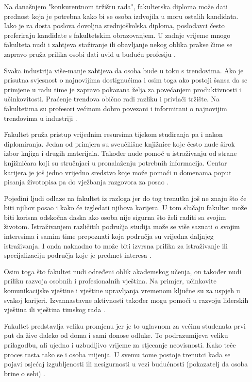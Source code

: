 \documentclass[]{foi}
\begin{document}
Na današnjem "konkurentnom tržištu rada", fakultetska diploma može dati prednost koja je potrebna kako bi se osoba izdvojila u moru ostalih kandidata. Iako je za dosta poslova dovoljna
srednjoškolska diploma, poslodavci često preferiraju kandidate s fakultetskim obrazovanjem. U zadnje vrijeme mnogo fakulteta nudi i zahtjeva stažiranje ili obavljanje nekog oblika prakse čime
se zapravo pruža prilika osobi dati uvid u buduću profesiju \cite{bisio2025college}. 

Svaka industrija više-manje zahtjeva da osoba bude u toku s trendovima. Ako je prisutna svjesnost o najnovijima dostignućima i osim toga ako postoji šansa da se primjene u radu time je zapravo 
pokazana želja za povećanjem produktivnosti i učinkovitosti. Praćenje trendova obično radi razliku i privlači tržište. Na fakultetima su profesori većinom dobro povezani i informirani
o najnovijim trendovima u industriji \cite{bisio2025college}.

Fakultet pruža pristup vrijednim resursima tijekom studiranja pa i nakon diplomiranja. Jedan od primjera su sveučilišne knjižnice koje često nude širok izbor knjiga i drugih materijala.
Također nude pomoć u istraživanju od strane knjižničara koji su stručnjaci u pronalaženju potrebnih informacija. Centar karijera je još jedno vrijedno sredstvo koje može pomoći u domenama
poput pisanja životopisa pa do vježbanja razgovora za posao \cite{bisio2025college}. 

Pojedini ljudi odlaze na fakultet iz razloga jer do tog trenutka još ne znaju što će biti njihov posao i kako će izgledati njihova karijera. U tom slučaju fakultet može biti korisna odskočna
daska ako osoba nije sigurna što želi raditi sa svojim životom. Istraživanjem različitih područja studija može se više saznati o svojim interesima i samim time prepoznati koja područja su vrijedna
daljnjeg istraživanja. I onda naknadno to može biti izvrsna prilika za istraživanje ili specijalizaciju područja koje je predmet interesa \cite{bisio2025college}.

Osim toga što fakultet nudi određeni oblik akademskog učenja, on također nudi priliku razvoja osobnih i profesionalnih vještina. Na primjer, učinkovite komunikacijske vještine i vještine upravljanja 
vremenom ključne su za uspjeh u svakoj karijeri. Izvannastavne aktivnosti također mogu pomoći u razvoju liderskih vještina ili vještina timskog rada \cite{bisio2025college}.

Fakultet predstavlja veliku promjenu jer je to uglavnom za većinu studenata prvi put da žive daleko od doma i sami donose odluke. To podrazumijeva veliku prilagodbu, ali ujedno i uzbudljivo vrijeme
za stjecanje neovisnosti. Kako teče proces rasta tako se i osoba mijenja. U svemu tome postoje trenutci kada se pojavi osjećaj izgubljenosti ili nesigurnosti u vezi budućnosti (pokazatelj
da osoba brine o sebi) \cite{bisio2025college}. 
\end{document}
